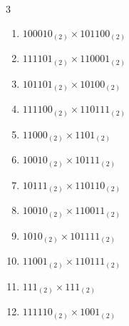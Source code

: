 \begin{multicols}{3}
\begin{enumerate}
  \item $100010_{(2)} \times 101100_{(2)}$


  \item $111101_{(2)} \times 110001_{(2)}$


\columnbreak %

  \item $101101_{(2)} \times 10100_{(2)}$


  \item $111100_{(2)} \times 110111_{(2)}$


  \item $11000_{(2)} \times 1101_{(2)}$


  \item $10010_{(2)} \times 10111_{(2)}$


  \item $10111_{(2)} \times 110110_{(2)}$


\columnbreak %

  \item $10010_{(2)} \times 110011_{(2)}$


  \item $1010_{(2)} \times 101111_{(2)}$


  \item $11001_{(2)} \times 110111_{(2)}$


  \item $111_{(2)} \times 111_{(2)}$


  \item $111110_{(2)} \times 1001_{(2)}$


\columnbreak %

\resetques


\end{enumerate}
\end{multicols}
